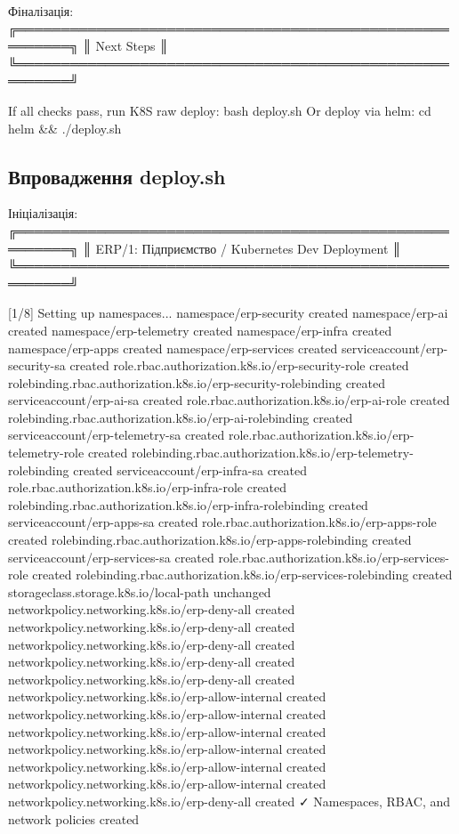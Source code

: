 \documentclass[12pt,a4paper]{article}
\let\originalfootnotesize\footnotesize
\let\oldverbatim\verbatim
\let\oldendverbatim\endverbatim
\renewenvironment{verbatim}{\originalfootnotesize\oldverbatim}{\oldendverbatim}
\begin{document}
Фіналізація:
\begin{verbatim}
╔════════════════════════════════════════════════════════╗
║                      Next Steps                        ║
╚════════════════════════════════════════════════════════╝

If all checks pass, run K8S raw deploy: bash deploy.sh
Or deploy via helm: cd helm && ./deploy.sh
\end{verbatim}

\newpage
\subsection{Впровадження deploy.sh}

Ініціалізація:
\begin{verbatim}
╔════════════════════════════════════════════════════════╗
║    ERP/1: Підприємство / Kubernetes Dev Deployment     ║
╚════════════════════════════════════════════════════════╝

[1/8] Setting up namespaces...
namespace/erp-security created
namespace/erp-ai created
namespace/erp-telemetry created
namespace/erp-infra created
namespace/erp-apps created
namespace/erp-services created
serviceaccount/erp-security-sa created
role.rbac.authorization.k8s.io/erp-security-role created
rolebinding.rbac.authorization.k8s.io/erp-security-rolebinding created
serviceaccount/erp-ai-sa created
role.rbac.authorization.k8s.io/erp-ai-role created
rolebinding.rbac.authorization.k8s.io/erp-ai-rolebinding created
serviceaccount/erp-telemetry-sa created
role.rbac.authorization.k8s.io/erp-telemetry-role created
rolebinding.rbac.authorization.k8s.io/erp-telemetry-rolebinding created
serviceaccount/erp-infra-sa created
role.rbac.authorization.k8s.io/erp-infra-role created
rolebinding.rbac.authorization.k8s.io/erp-infra-rolebinding created
serviceaccount/erp-apps-sa created
role.rbac.authorization.k8s.io/erp-apps-role created
rolebinding.rbac.authorization.k8s.io/erp-apps-rolebinding created
serviceaccount/erp-services-sa created
role.rbac.authorization.k8s.io/erp-services-role created
rolebinding.rbac.authorization.k8s.io/erp-services-rolebinding created
storageclass.storage.k8s.io/local-path unchanged
networkpolicy.networking.k8s.io/erp-deny-all created
networkpolicy.networking.k8s.io/erp-deny-all created
networkpolicy.networking.k8s.io/erp-deny-all created
networkpolicy.networking.k8s.io/erp-deny-all created
networkpolicy.networking.k8s.io/erp-deny-all created
networkpolicy.networking.k8s.io/erp-allow-internal created
networkpolicy.networking.k8s.io/erp-allow-internal created
networkpolicy.networking.k8s.io/erp-allow-internal created
networkpolicy.networking.k8s.io/erp-allow-internal created
networkpolicy.networking.k8s.io/erp-allow-internal created
networkpolicy.networking.k8s.io/erp-allow-internal created
networkpolicy.networking.k8s.io/erp-deny-all created
    ✓ Namespaces, RBAC, and network policies created


\end{verbatim}
\end{document}
